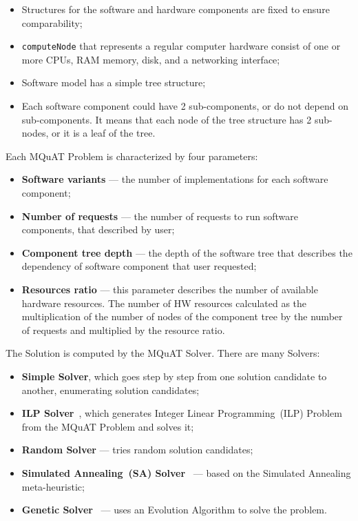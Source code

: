 \begin{itemize}
	\item Structures for the software and hardware components are fixed to ensure comparability;
	\item \texttt{computeNode} that represents a regular computer hardware consist of one or more CPUs, RAM memory, disk, and a networking interface;
	\item Software model has a simple tree structure;
	\item Each software component could have 2 sub-components, or do not depend on sub-components. It means that each node of the tree structure has 2 sub-nodes, or it is a leaf of the tree.
\end{itemize}

Each MQuAT Problem is characterized by four parameters:

\begin{itemize}
	\item \textbf{Software variants} — the number of implementations for each software component;
	\item \textbf{Number of requests} — the number of requests to run software components, that described by user;
	\item \textbf{Component tree depth} — the depth of the software tree that describes the dependency of software component that user requested;
	\item \textbf{Resources ratio} — this parameter describes the number of available hardware resources. The number of HW resources calculated as the multiplication of the number of nodes of the component tree by the number of requests and multiplied by the resource ratio.
\end{itemize}

The Solution is computed by the MQuAT Solver. There are many Solvers:

\begin{itemize}
	\item \textbf{Simple Solver}, which goes step by step from one solution candidate to another, enumerating solution candidates;
	\item \textbf{ILP Solver}~\cite{gotz18}, which generates Integer Linear Programming~(ILP) Problem from the MQuAT Problem and solves it;
	\item \textbf{Random Solver} — tries random solution candidates;
	\item \textbf{Simulated Annealing~(SA) Solver}~\cite{pukhkaiev19} — based on the Simulated Annealing meta-heuristic;
	\item \textbf{Genetic Solver}~\cite{ahmad18} — uses an Evolution Algorithm to solve the problem.
\end{itemize}

